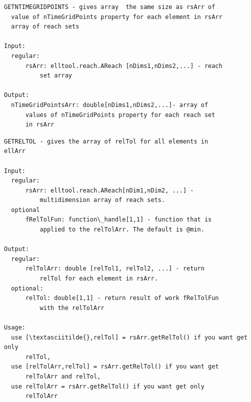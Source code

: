 \documentclass[letterpaper,10pt,english]{sphinxmanual}
\begin{document}
\begin{Verbatim}[commandchars=\\\{\}]
GETNTIMEGRIDPOINTS - gives array  the same size as rsArr of
  value of nTimeGridPoints property for each element in rsArr
  array of reach sets

Input:
  regular:
      rsArr: elltool.reach.AReach [nDims1,nDims2,...] - reach
          set array

Output:
  nTimeGridPointsArr: double[nDims1,nDims2,...]- array of
      values of nTimeGridPoints property for each reach set
      in rsArr
\end{Verbatim}

\begin{Verbatim}[commandchars=\\\{\}]
GETRELTOL - gives the array of relTol for all elements in
ellArr

Input:
  regular:
      rsArr: elltool.reach.AReach[nDim1,nDim2, ...] -
          multidimension array of reach sets.
  optional
      fRelTolFun: function\_handle[1,1] - function that is
          applied to the relTolArr. The default is @min.

Output:
  regular:
      relTolArr: double [relTol1, relTol2, ...] - return
          relTol for each element in rsArr.
  optional:
      relTol: double[1,1] - return result of work fRelTolFun
          with the relTolArr

Usage:
  use [\textasciitilde{},relTol] = rsArr.getRelTol() if you want get only
      relTol,
  use [relTolArr,relTol] = rsArr.getRelTol() if you want get
      relTolArr and relTol,
  use relTolArr = rsArr.getRelTol() if you want get only
      relTolArr
\end{Verbatim}
\end{document}

